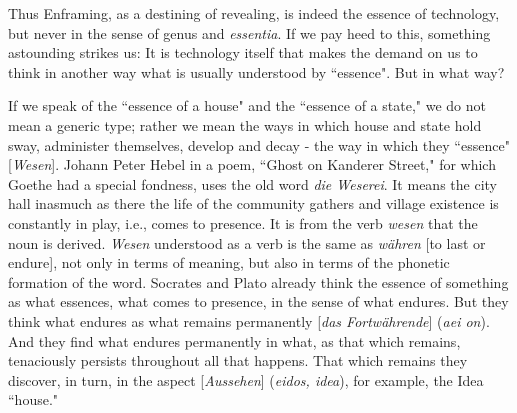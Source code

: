 Thus Enframing, as a destining of revealing, is indeed the essence of technology, but never in the sense of genus and \textit{essentia}. If we pay heed to this, something astounding strikes us: It is technology itself that makes the demand on us to think in another way what is usually understood by ``essence". But in what way?

If we speak of the ``essence of a house" and the ``essence of a state," we do not mean a generic type; rather we mean the ways in which house and state hold sway, administer themselves, develop and decay - the way in which they ``essence" [\textit{Wesen}]. Johann Peter Hebel in a poem, ``Ghost on Kanderer Street," for which Goethe had a special fondness, uses the old word \textit{die Weserei}. It means the city hall inasmuch as there the life of the community gathers and village existence is constantly in play, i.e., comes to presence. It is from the verb \textit{wesen} that the noun is derived. \textit{Wesen} understood as a verb is the same as \textit{w\"{a}hren} [to last or endure], not only in terms of meaning, but also in terms of the phonetic formation of the word. Socrates and Plato already think the essence of something as what essences, what comes to presence, in the sense of what endures. But they think what endures as what remains permanently [\textit{das Fortw\"{a}hrende}] (\textit{aei on}). And they find what endures permanently in what, as that which remains, tenaciously persists throughout all that happens. That which remains they discover, in turn, in the aspect [\textit{Aussehen}] (\textit{eidos, idea}), for example, the Idea ``house."

